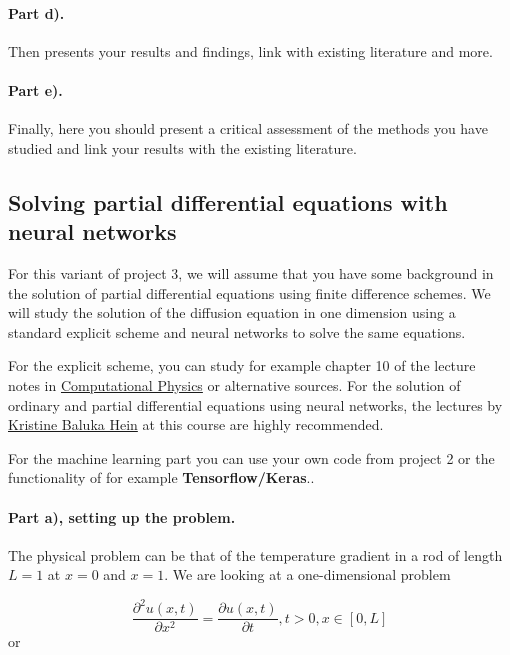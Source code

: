 \documentclass[%
oneside,                 %
final,                   %
10pt]{article}
\begin{document}
\paragraph{Part d).}
Then presents your results and findings, link with existing literature and more.

\paragraph{Part e).}
Finally, here you should present a critical assessment of the methods you have studied and link your results with the existing literature. 

\subsection*{Solving partial differential equations with neural networks}

For this variant of project 3, we will assume that you have some
background in the solution of partial differential equations using
finite difference schemes. We will study the solution of the diffusion
equation in one dimension using a standard explicit scheme and neural
networks to solve the same equations.

For the explicit scheme, you can study for example chapter 10 of the lecture notes in \href{{https://github.com/CompPhysics/ComputationalPhysics/blob/master/doc/Lectures/lectures2015.pdf}}{Computational Physics} or alternative sources. For the solution of ordinary and partial differential equations using neural networks, the lectures by \href{{https://compphysics.github.io/MachineLearning/doc/pub/odenn/html/odenn-bs.html}}{Kristine Baluka Hein} at this course are highly recommended.

For the machine learning part you can use your own code from project 2 or the functionality of for example \textbf{Tensorflow/Keras}.. 

\paragraph{Part a), setting up the problem.}
The physical problem can be that of the temperature gradient in a rod of length $L=1$ at $x=0$ and $x=1$.
We are looking at a one-dimensional
problem

\begin{equation*}
 \frac{\partial^2 u(x,t)}{\partial x^2} =\frac{\partial u(x,t)}{\partial t}, t> 0, x\in [0,L]
\end{equation*}
or
\end{document}
